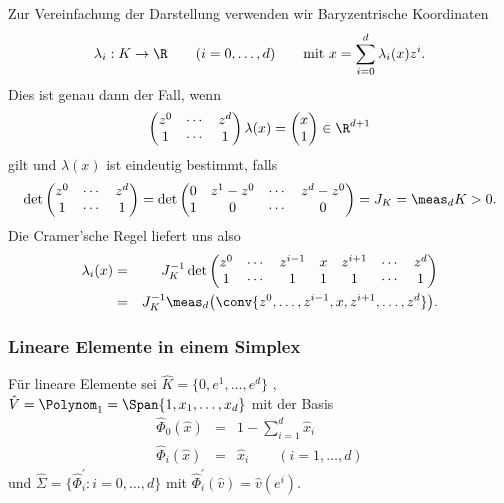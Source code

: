 Zur Vereinfachung der Darstellung verwenden wir Baryzentrische Koordinaten
\begin{eqnarray*}
    \lambda_i: K \to \R \qquad (i = 0, \dots, d)
    \qquad \text{mit } x = \sum_{i=0}^d \lambda_i(x) z^i.
\end{eqnarray*}
Dies ist genau dann der Fall, wenn
\begin{eqnarray*}
    \begin{pmatrix}
        z^0 & \cdots & z^d \\
        1 & \cdots & 1
    \end{pmatrix} \lambda (x)
    =
    \begin{pmatrix}
        x \\
        1
    \end{pmatrix} \in \R^{d+1}
\end{eqnarray*}
gilt und $\lambda(x)$ ist eindeutig bestimmt, falls
\begin{eqnarray*}
      \det \begin{pmatrix}
                z^0 & \cdots & z^d \\
                1 & \cdots & 1
           \end{pmatrix}
    = \det \begin{pmatrix}
                0 & z^1 - z^0 & \cdots & z^d - z^0 \\
                1 & 0 & \cdots & 0
           \end{pmatrix}
    = J_K
    = \meas_d K > 0.
\end{eqnarray*}
Die Cramer'sche Regel liefert uns also
\begin{eqnarray*}
        \lambda_i(x)
    &=& J_K^{-1} \det\begin{pmatrix}
                        z^0 & \cdots & z^{i-1} & x & z^{i+1} & \cdots & z^d \\
                        1 & \cdots & 1 & 1 & 1 & \cdots & 1
                   \end{pmatrix} \\
    &=& J_K^{-1} \meas_d\big(\conv\{z^0, \dots, z^{i-1},x,z^{i+1},\dots, z^d\}\big).
\end{eqnarray*}


\subsubsection{Lineare Elemente in einem Simplex}


Für lineare Elemente sei $\hat K = \{0, e^1, \dots, e^d\}$ ,
$\hat V = \Polynom_1 = \Span\{1, x_1, \dots, x_d\}$
mit der Basis
\begin{eqnarray*}
    \hat \Phi_0 (\hat x) &=& 1 - \sum_{i=1}^d \hat x_i \\
    \hat \Phi_i(\hat x) &=& \hat x_i
    \qquad (i = 1, \dots, d)
\end{eqnarray*}
und $\hat \Sigma = \{\hat{\Phi}_i^\prime: i = 0, \dots, d\}$ mit
$\hat{\Phi}_i^\prime(\hat v) = \hat v(e^i)$.

